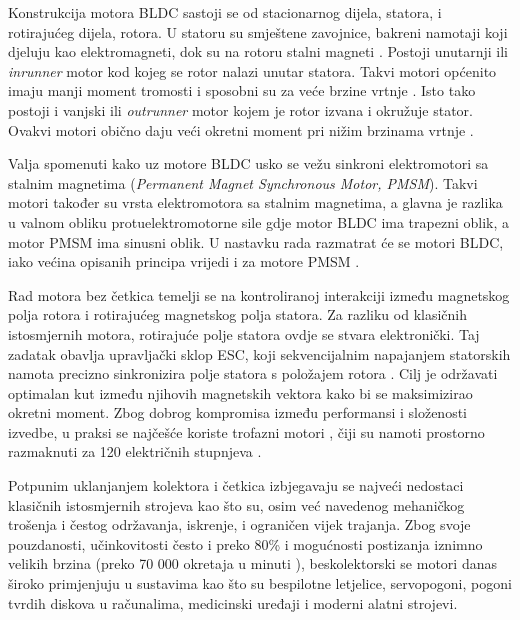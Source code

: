 \documentclass[diplomskirad]{fer}
\begin{document}
Konstrukcija motora BLDC sastoji se od stacionarnog dijela, statora, i
rotirajućeg dijela, rotora. U statoru su smještene zavojnice, bakreni namotaji
koji djeluju kao elektromagneti, dok su na rotoru stalni magneti
\cite{elektromotor-beskolektorski}. Postoji unutarnji ili \textit{inrunner}
motor kod kojeg se rotor nalazi unutar statora. Takvi motori općenito imaju
manji moment tromosti i sposobni su za veće brzine vrtnje \cite{cite:bldc}.
Isto tako postoji i vanjski ili \textit{outrunner} motor kojem je rotor izvana
i okružuje stator. Ovakvi motori obično daju veći okretni moment pri nižim
brzinama vrtnje \cite{cite:bldc}.


Valja spomenuti kako uz motore BLDC usko se vežu sinkroni elektromotori sa
stalnim magnetima (\textit{Permanent Magnet Synchronous Motor, PMSM}). Takvi
motori također su vrsta elektromotora sa stalnim magnetima, a glavna je razlika
u valnom obliku protuelektromotorne sile gdje motor BLDC ima trapezni oblik, a
motor PMSM ima sinusni oblik. U nastavku rada razmatrat će se motori BLDC, iako
većina opisanih principa vrijedi i za motore PMSM
\cite{elektromotor-sa-stalnim-magnetima}.

Rad motora bez četkica temelji se na kontroliranoj interakciji između
magnetskog polja rotora i rotirajućeg magnetskog polja statora. Za razliku od
klasičnih istosmjernih motora, rotirajuće polje statora ovdje se stvara
elektronički. Taj zadatak obavlja upravljački sklop ESC, koji sekvencijalnim
napajanjem statorskih namota precizno sinkronizira polje statora s položajem
rotora \cite{cite:disertacija}. Cilj je održavati optimalan kut između njihovih
magnetskih vektora kako bi se maksimizirao okretni moment. Zbog dobrog
kompromisa između performansi i složenosti izvedbe, u praksi se najčešće
koriste trofazni motori \cite{cite:trofazni}, čiji su namoti prostorno
razmaknuti za 120 električnih stupnjeva \cite{MicrochipAN885}.

Potpunim uklanjanjem kolektora i četkica izbjegavaju se najveći nedostaci
klasičnih istosmjernih strojeva kao što su, osim već navedenog mehaničkog
trošenja i čestog održavanja, iskrenje, i ograničen vijek trajanja. Zbog svoje
pouzdanosti, učinkovitosti često i preko 80\% \cite{motor-ucinkovitost} i
mogućnosti postizanja iznimno velikih brzina (preko 70 000 okretaja u minuti
\cite{motor-rpm}), beskolektorski se motori danas široko primjenjuju u
sustavima kao što su bespilotne letjelice, servopogoni, pogoni tvrdih diskova u
računalima, medicinski uređaji i moderni alatni strojevi.  \newpage
\end{document}
